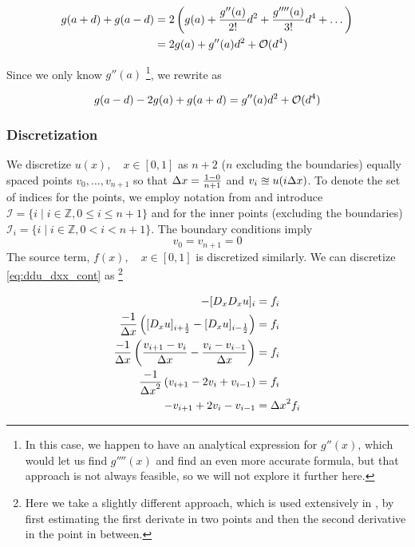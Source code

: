 \documentclass[a4paper]{article}
\begin{document}
\begin{align}
    g(a+d) + g(a-d)
        &= 2\left( g(a) + \frac{g''(a)}{2!} d^2 + \frac{g''''(a)}{3!} d^4 + \dots \right) \\
        &= 2g(a) + g''(a) d^2 + {\mathcal{O}}(d^4)
\end{align}

Since we only know $g''(a)$ \footnote{In this case, we happen to have an analytical expression for $g''(x)$, which would let us find $g''''(x)$ and find an even more accurate formula, but that approach is not always feasible, so we will not explore it further here.}, we rewrite as

\begin{equation}
     g(a-d) - 2g(a) + g(a+d) = g''(a)d^2 + {\mathcal{O}}(d^4)
\end{equation}

\subsubsection{Discretization}
We discretize $u(x), \quad x \in [0, 1]$ as $n+2$ ($n$ excluding the boundaries) equally spaced points $v_0, \dots, v_{n+1}$ so that ${\Delta x} = \frac{1 - 0}{n+1}$ and $v_i \approxeq u(i {\Delta x})$. To denote the set of indices for the points, we employ notation from \cite{hpl_fdm} and introduce $\mathcal{I} = \{ i \mid i \in \mathbb{Z}, 0 \leq i \leq n + 1\}$ and for the inner points (excluding the boundaries) $\mathcal{I}_i = \{ i \mid i \in \mathbb{Z}, 0 < i < n + 1\}$.
The boundary conditions imply
\begin{equation}
v_0 = v_{n+1} = 0
\label{eq:boundaries_disc}
\end{equation}
The source term, $f(x), \quad x \in [0, 1]$ is discretized similarly. We can discretize \eqref{eq:ddu_dxx_cont} as
\footnote{Here we take a slightly different approach, which is used extensively in \cite{hpl_fdm}, by first estimating the first derivate in two points and then the second derivative in the point in between.}

\begin{align*}
-[D_x D_x u]_i &= f_i \\
\frac{-1}{{\Delta x}} \left( [D_x u]_{i+\frac{1}{2}} - [D_x u]_{i-\frac{1}{2}} \right) &= f_i \\
\frac{-1}{{\Delta x}} \left( \frac{v_{i+1} - v_{i}}{{\Delta x}} - \frac{v_{i} - v_{i-1}}{{\Delta x}} \right) &= f_i \\
\frac{-1}{{\Delta x}^2} \left( v_{i+1} - 2v_{i} + v_{i-1} \right) &= f_i \\
-v_{i+1} + 2v_{i} - v_{i-1}  &= {\Delta x}^2 f_i
\end{align*}
\end{document}
